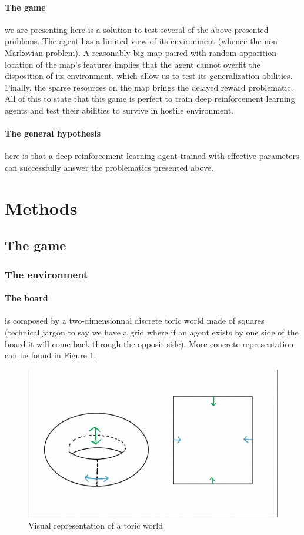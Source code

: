 \documentclass{article}
\begin{document}
\paragraph{The game}
we are presenting here is a solution to test several of the above presented problems. The agent has a limited view of its environment (whence the non-Markovian problem). A reasonably big map paired with random apparition location of the map's features implies that the agent cannot overfit the disposition of its environment, which allow us to test its generalization abilities. Finally, the sparse resources on the map brings the delayed reward problematic. All of this to state that this game is perfect to train deep reinforcement learning agents and test their abilities to survive in hostile environment.

\paragraph{The general hypothesis}
here is that a deep reinforcement learning agent trained with effective parameters can successfully answer the problematics presented above.

\section{Methods}

\subsection{The game}

\subsubsection{The environment}

\paragraph{The board}
is composed by a two-dimensionnal discrete toric world made of squares (technical jargon to say we have a grid where if an agent exists by one side of the board it will come back through the opposit side). More concrete representation can be found in Figure 1.

\begin{figure}
\centering
\includegraphics[scale=0.2]{toric_world.png}
\caption{Visual representation of a toric world}
\end{figure}
\end{document}
